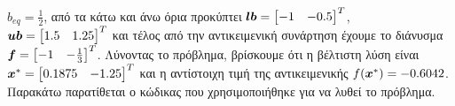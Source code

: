 $b_{eq} = \frac{1}{2}$, από τα κάτω και άνω όρια προκύπτει
$\bm{lb} = \begin{bmatrix}-1 & -0.5 \end{bmatrix}^T$, $\bm{ub} = \begin{bmatrix}1.5 & 1.25 \end{bmatrix}^T$
και τέλος από την αντικειμενική συνάρτηση έχουμε το διάνυσμα
$\bm{f} = \begin{bmatrix}-1 & -\frac{1}{3}\end{bmatrix}^T$. Λύνοντας το πρόβλημα,
βρίσκουμε ότι η βέλτιστη λύση είναι $\bm{x}^* = \begin{bmatrix} 0.1875 & -1.25 \end{bmatrix}^T$
και η αντίστοιχη τιμή της αντικειμενικής $f(\bm{x}^*) = -0.6042$. Παρακάτω παρατίθεται ο κώδικας
που χρησιμοποιήθηκε για να λυθεί το πρόβλημα.
\begin{otherlanguage}{english}

\end{otherlanguage}

